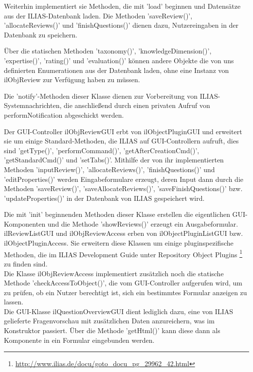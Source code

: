 \documentclass[a4paper]{scrreprt}
\begin{document}
Weiterhin implementiert sie Methoden, die mit 'load' beginnen und Datensätze aus der ILIAS-Datenbank laden. 
Die Methoden 'saveReview()', 'allocateReviews()' und 'finishQuestions()' dienen dazu, Nutzereingaben in der Datenbank zu speichern. 

Über die statischen Methoden 'taxonomy()', 'knowledgeDimension()', 'expertise()', 'rating()' und 'evaluation()' können andere Objekte die von uns definierten Enumerationen aus der Datenbank laden, ohne eine Instanz von ilObjReview zur Verfügung haben zu müssen. 

Die 'notify'-Methoden dieser Klasse dienen zur Vorbereitung von ILIAS-Systemnachrichten, die anschließend durch einen privaten Aufruf von performNotification abgeschickt werden.

Der GUI-Controller ilObjReviewGUI erbt von ilObjectPluginGUI und erweitert sie um einige Standard-Methoden, die ILIAS auf GUI-Controllern aufruft, dies sind 'getType()', 'performCommand()', 'getAfterCreationCmd()', 'getStandardCmd()' und 'setTabs()'. 
Mithilfe der von ihr implementierten Methoden 'inputReview()', 'allocateReviews()', 'finishQuestions()' und 'editProperties()' werden Eingabeformulare erzeugt, deren Input dann durch die Methoden 'saveReview()', 'saveAllocateReviews()', 'saveFinishQuestions()' bzw. 'updateProperties()' in der Datenbank von ILIAS gespeichert wird. 

Die mit 'init' beginnenden Methoden dieser Klasse erstellen die eigentlichen GUI-Komponenten und die Methode 'showReviews()' erzeugt ein Ausgabeformular.\\

ilReviewListGUI und ilObjReviewAccess erben von ilObjectPluginListGUI bzw. ilObjectPluginAccess. 
Sie erweitern diese Klassen um einige pluginspezifische Methoden, die im ILIAS Development Guide unter Repository Object Plugins \footnote{\url{http://www.ilias.de/docu/goto_docu_pg_29962_42.html}} zu finden sind. \\

Die Klasse ilObjReviewAccess implementiert zusätzlich noch die statische Methode 'checkAccessToObject()', die vom GUI-Controller aufgerufen wird, um zu prüfen, ob ein Nutzer berechtigt ist, sich ein bestimmtes Formular anzeigen zu lassen.\\

Die GUI-Klasse ilQuestionOverviewGUI dient lediglich dazu, eine von ILIAS gelieferte Fragenvorschau mit zusätzlichen Daten anzureichern, was im Konstruktor passiert.
Über die Methode 'getHtml()' kann diese dann als Komponente in ein Formular eingebunden werden.\\
\end{document}
